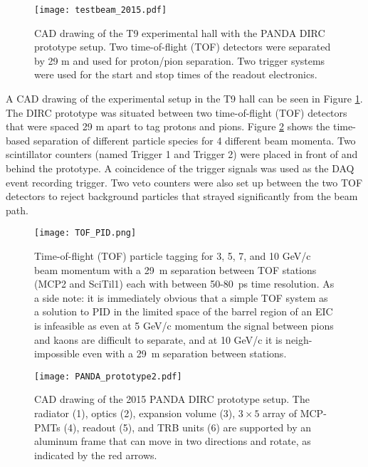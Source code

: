 \begin{figure}[!htb]
	\centering
	\texttt{[image: testbeam\_2015.pdf]}
	\caption{CAD drawing of the T9 experimental hall with the PANDA DIRC prototype setup. Two time-of-flight (TOF) detectors were separated by 29 m and used for proton/pion separation. Two trigger systems were used for the start and stop times of the readout electronics.}
	\label{fig:testbeam_2015}
\end{figure}

A CAD drawing of the experimental setup in the T9 hall can be seen in Figure \ref{fig:testbeam_2015}. The DIRC prototype was situated between two time-of-flight (TOF) detectors that were spaced 29 m apart to tag protons and pions. Figure \ref{fig:TOF_PID} shows the time-based separation of different particle species for 4 different beam momenta. Two scintillator counters (named Trigger 1 and Trigger 2) were placed in front of and behind the prototype. A coincidence of the trigger signals was used as the DAQ event recording trigger. Two veto counters were also set up between the two TOF detectors to reject background particles that strayed significantly from the beam path.

\begin{figure}[!htb]
	\centering
	\texttt{[image: TOF\_PID.png]}
	\caption{Time-of-flight (TOF) particle tagging for 3, 5, 7, and 10 GeV/c beam momentum with a 29~m separation between TOF stations (MCP2 and SciTil1) each with between 50-80~ps time resolution. As a side note: it is immediately obvious that a simple TOF system as a solution to PID in the limited space of the barrel region of an EIC is infeasible as even at 5 GeV/c momentum the signal between pions and kaons are difficult to separate, and at 10 GeV/c it is neigh-impossible even with a 29~m separation between stations. }
	\label{fig:TOF_PID}
\end{figure}

\begin{figure}[!htb]
	\centering
	\texttt{[image: PANDA\_prototype2.pdf]}
	\caption{CAD drawing of the 2015 PANDA DIRC prototype setup. The radiator (1), optics (2), expansion volume (3), $3\times5$ array of MCP-PMTs (4), readout (5), and TRB units (6) are supported by an aluminum frame that can move in two directions and rotate, as indicated by the red arrows.}
	\label{fig:PANDA_prototype}
\end{figure}

